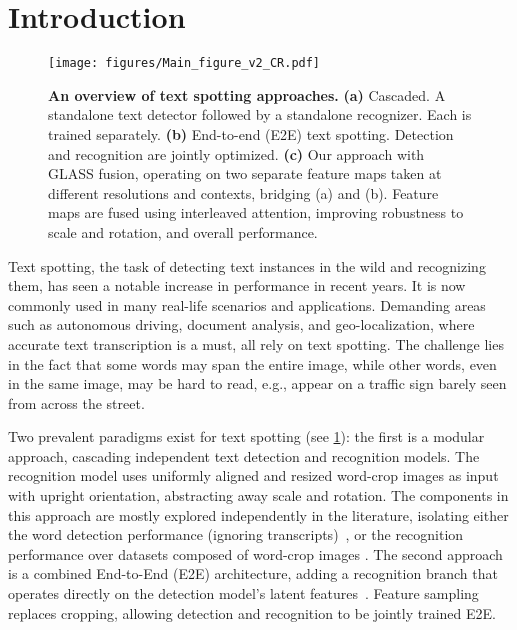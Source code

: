 \documentclass[runningheads]{llncs}
\begin{document}
%
 




\section{Introduction}
\label{sec:introduction}
\begin{figure}
 \centering
  \texttt{[image: figures/Main\_figure\_v2\_CR.pdf]}
  \caption{\textbf{An overview of text spotting approaches. }  \textbf{(a)} Cascaded. A standalone text detector followed by a standalone recognizer. Each is trained separately. 
\textbf{(b)} End-to-end (E2E) text spotting. Detection and recognition are jointly optimized. 
\textbf{(c)} Our approach with GLASS fusion, operating on two separate feature maps taken at different resolutions and contexts, bridging (a) and (b). Feature maps are fused using interleaved attention, improving robustness to scale and rotation, and overall performance.}
  \label{fig:main}
\end{figure}
Text spotting, the task of detecting text instances in the wild and recognizing them,  has seen a notable increase in performance in recent years.
It is now commonly used in many real-life scenarios and applications.
Demanding areas such as autonomous driving,  document analysis, and geo-localization, where accurate text transcription is a must, all rely on text spotting. 
The challenge lies in the fact that some words may span the entire image, while other words, even in the same image, may be hard to read, e.g., appear on a traffic sign barely seen from across the street. 

Two prevalent paradigms exist for text spotting (see \cref{fig:main}): the first is a modular approach, cascading independent text detection and recognition models.
The recognition model uses uniformly aligned and resized  word-crop images as input with upright orientation, abstracting away scale and rotation.
The components in this approach are mostly explored independently in the literature, isolating either the word detection performance (ignoring transcripts)~\cite{zhou2017east,buvsta2018e2e,baek2019craft,liao2020db,qin2021mask}, or the recognition performance over datasets composed of word-crop images \cite{clova,shi2018aster,litman2020scatter,lu2021master}.
The second approach is a combined End-to-End (E2E) architecture, adding a recognition branch that operates directly on the detection model's latent features~\cite{feng2019textdragon,baek2020crafts,krylov2021yamts,qiao2020mango,lyu2018spotter,liao2020spotterV3,liu2021abcnetV2}.
Feature sampling replaces cropping, allowing detection and recognition to be jointly trained E2E.
\end{document}
